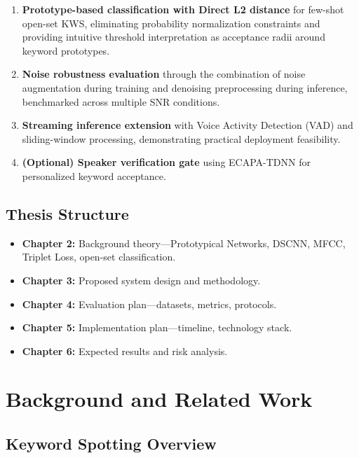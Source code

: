 \documentclass[12pt,a4paper]{report}
\begin{document}
\begin{enumerate}
    \item \textbf{Prototype-based classification with Direct L2 distance} for
          few-shot open-set KWS, eliminating probability normalization
          constraints and providing intuitive threshold interpretation as
          acceptance radii around keyword prototypes.
    \item \textbf{Noise robustness evaluation} through the combination of
          noise augmentation during training and denoising preprocessing during
          inference, benchmarked across multiple SNR conditions.
    \item \textbf{Streaming inference extension} with Voice Activity Detection
          (VAD) and sliding-window processing, demonstrating practical
          deployment feasibility.
    \item \textbf{(Optional) Speaker verification gate} using ECAPA-TDNN for
          personalized keyword acceptance.
\end{enumerate}

\section{Thesis Structure}

\begin{itemize}
    \item \textbf{Chapter 2:} Background theory---Prototypical Networks, DSCNN,
          MFCC, Triplet Loss, open-set classification.
    \item \textbf{Chapter 3:} Proposed system design and methodology.
    \item \textbf{Chapter 4:} Evaluation plan---datasets, metrics, protocols.
    \item \textbf{Chapter 5:} Implementation plan---timeline, technology stack.
    \item \textbf{Chapter 6:} Expected results and risk analysis.
\end{itemize}


\chapter{Background and Related Work}

\section{Keyword Spotting Overview}
\end{document}
